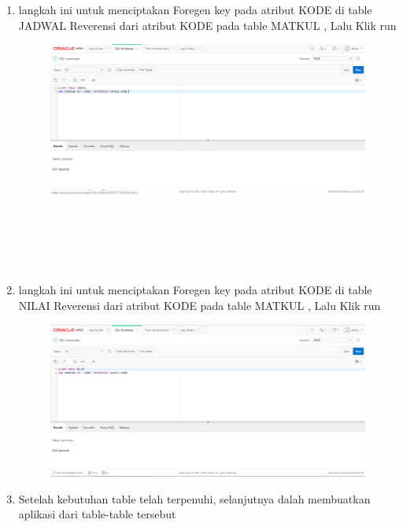 \documentclass[12pt, times new roman, a4paper]{article}
\begin{document}
\begin{enumerate}
\item langkah ini untuk menciptakan Foregen key pada atribut KODE di table JADWAL Reverensi dari atribut KODE pada table MATKUL , Lalu Klik run 
\begin{figure} [h]
	\centering
		\includegraphics[scale=0.4]{gambar/13}
\end{figure}
\\
\\
\\
\\
\item langkah ini untuk menciptakan Foregen key pada atribut KODE di table NILAI Reverensi dari atribut KODE pada table MATKUL , Lalu Klik run 
\begin{figure} [h]
	\centering
		\includegraphics[scale=0.4]{gambar/14}
\end{figure}

\item Setelah kebutuhan table telah terpenuhi, selanjutnya dalah membuatkan aplikasi dari table-table tersebut


\end{enumerate}
\end{document}
